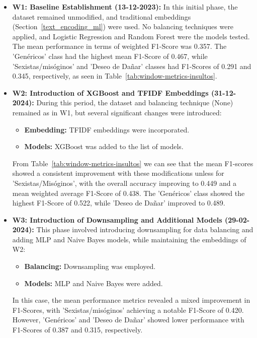 \begin{itemize}
    \item \textbf{W1: Baseline Establishment (13-12-2023):} In this initial phase, the dataset remained unmodified, and traditional embeddings (Section~\ref{text_encoding_ml}) were used. No balancing techniques were applied, and Logistic Regression and Random Forest were the models tested. The mean performance in terms of weighted F1-Score was 0.357. The 'Genéricos' class had the highest mean F1-Score of 0.467, while 'Sexistas/misóginos' and 'Deseo de Dañar' classes had F1-Scores of 0.291 and 0.345, respectively, as seen in Table~\ref{tab:window-metrics-insultos}.

    \item \textbf{W2: Introduction of XGBoost and TFIDF Embeddings (31-12-2024):} During this period, the dataset and balancing technique (None) remained as in W1, but several significant changes were introduced:
        \begin{itemize}
            \item \textbf{Embedding:} TFIDF embeddings were incorporated.
            \item \textbf{Models:} XGBoost was added to the list of models.
        \end{itemize}
        From Table~\ref{tab:window-metrics-insultos} we can see that the mean F1-scores showed a consistent improvement with these modifications unless for 'Sexistas/Misóginos', with the overall accuracy improving to 0.449 and a mean weighted average F1-Score of 0.438. The 'Genéricos' class showed the highest F1-Score of 0.522, while 'Deseo de Dañar' improved to 0.489.
        
    \item \textbf{W3: Introduction of Downsampling and Additional Models (29-02-2024):} This phase involved introducing downsampling for data balancing and adding MLP and Naive Bayes models, while maintaining the embeddings of W2:
        \begin{itemize}
            \item \textbf{Balancing:} Downsampling was employed.
            \item \textbf{Models:} MLP and Naive Bayes were added.
        \end{itemize}
    In this case, the mean performance metrics revealed a mixed improvement in F1-Scores, with 'Sexistas/misóginos' achieving a notable F1-Score of 0.420. However, 'Genéricos' and 'Deseo de Dañar' showed lower performance with F1-Scores of 0.387 and 0.315, respectively.
    

\end{itemize}
